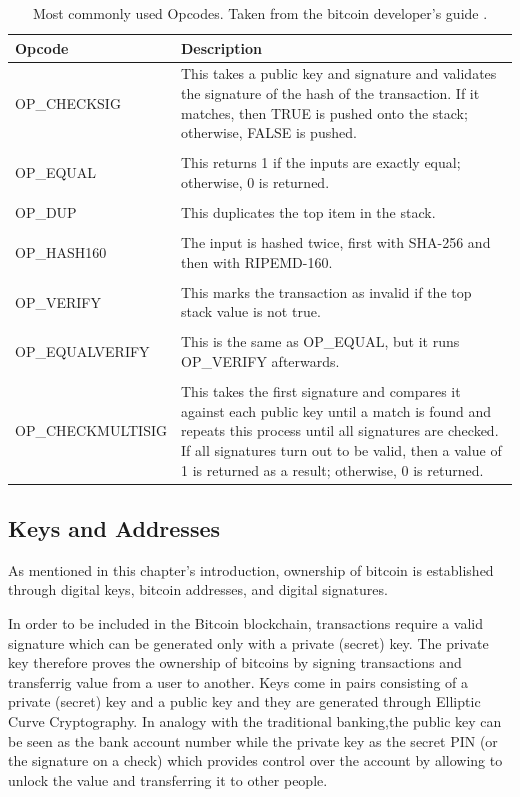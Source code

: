 \begin{table}[!ht]
\footnotesize
\begin{tabularx}{\textwidth}{l X}
\hline
\textbf{Opcode} & \textbf{Description}  \\\hline
OP\_CHECKSIG & This takes a public key and signature and validates the signature of the hash of the transaction. If it matches, then TRUE is pushed onto the stack; otherwise, FALSE is pushed.  \\
\\
OP\_EQUAL & This returns 1 if the inputs are exactly equal; otherwise, 0 is returned.  \\
\\
OP\_DUP & This duplicates the top item in the stack.  \\
\\
OP\_HASH160 & The input is hashed twice, first with SHA-256 and then with RIPEMD-160. \\
\\
OP\_VERIFY & This marks the transaction as invalid if the top stack value is not true. \\
\\
OP\_EQUALVERIFY & This is the same as OP\_EQUAL, but it runs OP\_VERIFY afterwards. \\
\\
OP\_CHECKMULTISIG & This takes the first signature and compares it against each public key until a match is found and repeats this process until all signatures are checked. If all signatures turn out to be valid, then a value of 1 is returned as a result; otherwise, 0 is returned. \\
\hline
\end{tabularx}
\caption{\footnotesize Most commonly used Opcodes. Taken from the
bitcoin developer's guide \cite{bitcoin-developer-guide}. }
\label{tab:opcode-example}
\end{table}








\subsection{Keys and Addresses}
As mentioned in this chapter's introduction, ownership of bitcoin is established
through digital keys, bitcoin addresses, and digital signatures.

In order to be included in the Bitcoin blockchain, transactions require a valid
signature which can be generated only with a private (secret) key. The private
key therefore proves the ownership of bitcoins by signing transactions and
transferrig value from a user to another. Keys come in pairs consisting of a
private (secret) key and a public key and they are generated through Elliptic
Curve Cryptography. In analogy with the traditional banking,the public key can be
seen as the bank account number while the private key as the secret PIN (or the
signature on a check) which provides control over the account by allowing to unlock
the value and transferring it to other people.

